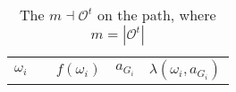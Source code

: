 \documentclass[12pt,letter]{article}
\newcommand{\Omicron}{\mathcal{O}}
\theoremstyle{definition}
\theoremstyle{remark}
\theoremstyle{claim}
\begin{document}
\begin{landscape}
\begin{table}[!htbp]
\caption{The $m\dashv\Omicron^t$ on the path, where $m=|\Omicron^t|$}
\label{table:eqm_path_ot2}
\begin{center}
\begin{tabular}{c c | c | c | c}
$\omega_i$ 	 & 	   &	$f(\omega_i)$  &	$a_{G_i}$ & $\lambda(\omega_i,a_{G_i})$ \\

\end{tabular}
\end{center}
\end{table}
\end{landscape}
\end{document}
